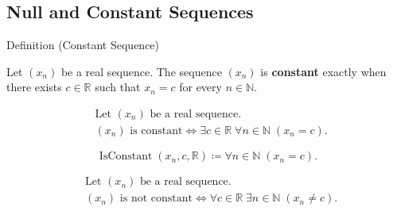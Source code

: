\subsection*{Null and Constant Sequences}


\begin{definitionbox}{Definition (Constant Sequence)}
\begin{definition}
\label{def:constant-sequence}
Let $(x_n)$ be a real sequence. The sequence $(x_n)$ is
\textbf{constant} exactly when there exists $c \in \mathbb{R}$ such that
$x_n = c$ for every $n \in \mathbb{N}$.
\end{definition}
\end{definitionbox}

\begin{remark*}
\[
\begin{aligned}
&\text{Let } (x_n) \text{ be a real sequence.}\\
&(x_n) \text{ is constant}
\Longleftrightarrow
\exists c \in \mathbb{R}\;
\forall n \in \mathbb{N}\;(x_n = c).
\end{aligned}
\]
\end{remark*}

\begin{remark*}
\[
\operatorname{IsConstant}(x_n,c,\mathbb{R})
\coloneqq
\forall n \in \mathbb{N}\;(x_n = c).
\]
\end{remark*}

\begin{remark*}
\[
\begin{aligned}
&\text{Let } (x_n) \text{ be a real sequence.}\\
&(x_n) \text{ is not constant}
\Longleftrightarrow
\forall c \in \mathbb{R}\;
\exists n \in \mathbb{N}\;(x_n \neq c).
\end{aligned}
\]
\end{remark*}

